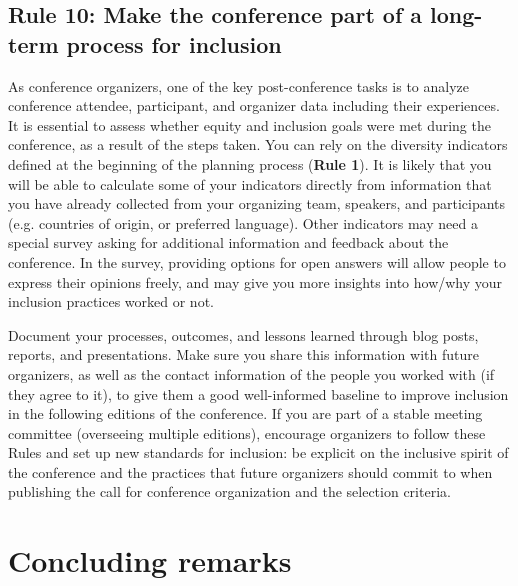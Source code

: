 \documentclass[10pt,letterpaper]{article}
\begin{document}
\subsection*{Rule 10: Make the conference part of a long-term process for inclusion}
\label{rule_process}

As conference organizers, one of the key post-conference tasks is to analyze conference attendee, participant, and organizer data including their experiences. It is essential to assess whether equity and inclusion goals were met during the conference, as a result of the steps taken. 
 You can rely on the diversity indicators defined at the beginning of the planning process (\textbf{Rule 1}). 
It is likely that you will be able to calculate some of your indicators directly from information that you have already collected from your organizing team, speakers, and participants (e.g. countries of origin, or preferred language).
Other indicators may need a special survey asking for additional information and feedback about the conference. 
In the survey, providing options for open answers will allow people to express their opinions freely, and may give you more insights into how/why your inclusion practices worked or not. 

Document your processes, outcomes, and lessons learned through blog posts, reports, and presentations. 
Make sure you share this information with future organizers, as well as the contact information of the people you worked with (if they agree to it), to give them a good well-informed baseline to improve inclusion in the following editions of the conference.
If you are part of a stable meeting committee (overseeing multiple editions), encourage organizers to follow these Rules and set up new standards for inclusion: be explicit on the inclusive spirit of the conference and the practices that future organizers should commit to when publishing the call for conference organization and the selection criteria. 


\section*{Concluding remarks}
\end{document}

